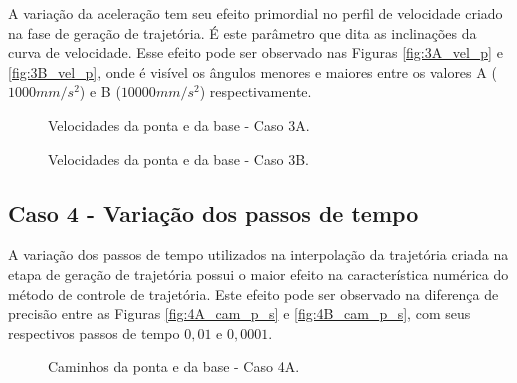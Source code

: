 A variação da aceleração tem seu efeito primordial no perfil de velocidade criado na fase de geração de trajetória. É este parâmetro que dita as inclinações da curva de velocidade. Esse efeito pode ser observado nas Figuras \ref{fig:3A_vel_p} e \ref{fig:3B_vel_p}, onde é visível os ângulos menores e maiores entre os valores A (\(1000 mm/s^2\)) e B (\(10000 mm/s^2\)) respectivamente.

\begin{figure}[H]
    \centering
    \hfill
    \caption{Velocidades da ponta e da base - Caso 3A.}
    \label{fig:3A_vel}
\end{figure}


\begin{figure}[H]
    \centering
    \hfill
    \caption{Velocidades da ponta e da base - Caso 3B.}
    \label{fig:3B_vel}
\end{figure}




\subsection{Caso 4 - Variação dos passos de tempo}

A variação dos passos de tempo utilizados na interpolação da trajetória criada na etapa de geração de trajetória possui o maior efeito na característica numérica do método de controle de trajetória. Este efeito pode ser observado na diferença de precisão entre as Figuras \ref{fig:4A_cam_p_s} e \ref{fig:4B_cam_p_s}, com seus respectivos passos de tempo \(0,01\) e \(0,0001\).

\begin{figure}[H]
    \centering
    \hfill
    \hfill
    \hfill
    \caption{Caminhos da ponta e da base - Caso 4A.}
    \label{fig:4A_cam}
\end{figure}


